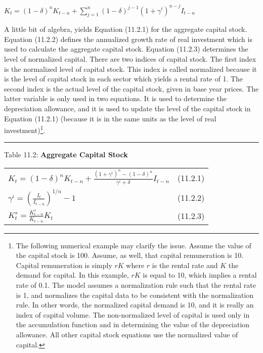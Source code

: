 \documentclass[12pt]{article}
\begin{document}
\begin{center}

$K_t = (1 - \delta)^n K_{t-n} + \displaystyle \sum^n_{j=1} (1-\delta)^{j-1} (1 + \gamma^i)^{n-j} I_{t-n}$

\end{center}

A little bit of algebra, yields Equation (11.2.1) for the aggregate capital stock. Equation (11.2.2) defines the annualized growth rate of real investment which is used to calculate the aggregate capital stock. Equation (11.2.3) determines the level of normalized capital. There are two indices of capital stock. The first index is the normalized level of capital stock. This index is called normalized because it is the level of capital stock in each sector which yields a rental rate of 1. The second index is the actual level of the capital stock, given in base year prices. The latter variable is only used in two equations. It is used to determine the depreciation allowance, and it is used to update the level of the capital stock in Equation (11.2.1) (because it is in the same units as the level of real investment)\footnote{The following numerical example may clarify the issue. Assume the value of the capital stock is 100. Assume, as well, that capital remuneration is 10. Capital remuneration is simply $rK$ where $r$ is the rental rate and $K$ the demand for capital. In this example, $rK$ is equal to 10, which implies a rental rate of 0.1. The model assumes a normalization rule such that the rental rate is 1, and normalizes the capital data to be consistent with the normalization rule. In other words, the normalized capital demand is 10, and it is really an index of capital volume. The non-normalized level of capital is used only in the accumulation function and in determining the value of the depreciation allowance. All other capital stock equations use the normalized value of capital.}.


\noindent\rule{\linewidth}{0.4pt}
\begin{center}
\begin{large}
{\centering Table 11.2: \textbf{Aggregate Capital Stock} \par}


\begin{tabular}{>{\raggedright}p{} l}


$K_t = (1-\delta)^n K_{t-n} + \frac{(1+\gamma^i)^n - (1-\delta)^n}{\gamma^i + \delta} I_{t-n}$ & (11.2.1) \\[15pt]

$\gamma^i = \left(\frac{I_t}{I_{t-n}}\right)^{1/n} - 1$ & (11.2.2) \\[15pt]

$K^s_t = \frac{K^s_{t-n}}{K_{t-n}}K_t$ & (11.2.3) \\[20pt]

\hline
\end{tabular}
\end{large}
\end{center}
\end{document}
